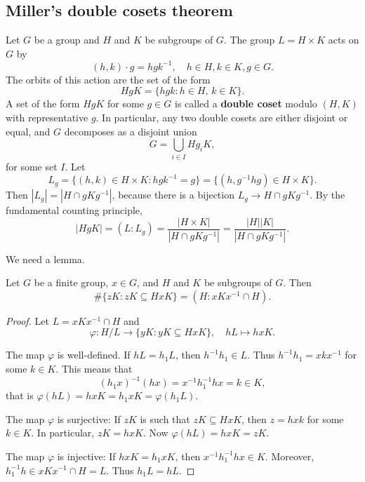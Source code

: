 


\subsection{Miller's double cosets theorem}

Let $G$ be a group and $H$ and $K$ be subgroups of $G$. 
The group $L=H\times K$ acts on $G$ by
\[
(h,k)\cdot g=hgk^{-1},\quad h\in H,k\in K,g\in G.
\]
The orbits of this action are the set of the form 
\[
HgK=\{hgk:h\in H,\,k\in K\}.
\]
A set of the form $HgK$ for some $g\in G$ is called a \textbf{double coset} modulo $(H,K)$ 
with representative $g$. In particular, 
any two double cosets are either disjoint or equal, and $G$ decomposes
as a disjoint union 
\[
G=\bigcup_{i\in I}Hg_iK,
\]
for some set $I$. Let 
\[
L_g=\{(h,k)\in H\times K:hgk^{-1}=g\}=\{(h,g^{-1}hg)\in H\times K\}.
\]
Then
$|L_g|=|H\cap gKg^{-1}|$, 
because there is a bijection $L_g\to H\cap gKg^{-1}$.  
By the fundamental counting principle, 
\[
|HgK|=(L:L_g)=\frac{|H\times K|}{|H\cap gKg^{-1}|}=\frac{|H||K|}{|H\cap gKg^{-1}|}.
\]

We need a lemma. 

\begin{lemma}
\label{lem:Miller}
    Let $G$ be a finite group, $x\in G$, and $H$ and $K$ be subgroups of $G$. Then
    \[
    \#\{zK:zK\subseteq HxK\}=(H:xKx^{-1}\cap H).
    \]
\end{lemma}

\begin{proof}
    Let $L=xKx^{-1}\cap H$ and 
    \[
    \varphi\colon H/L\to\{yK:yK\subseteq HxK\},\quad 
    hL\mapsto hxK.
    \]

    The map $\varphi$ is well-defined. If $hL=h_1L$, then $h^{-1}h_1\in L$. Thus 
    $h^{-1}h_1=xkx^{-1}$ for some $k\in K$. This means that
    \[
    (h_1x)^{-1}(hx)=x^{-1}h_1^{-1}hx=k\in K,
    \]
    that is $\varphi(hL)=hxK=h_1xK=\varphi(h_1L)$. 

    The map $\varphi$ is surjective: If $zK$ is such that $zK\subseteq HxK$, then 
    $z=hxk$ for some $k\in K$. In particular, 
    $zK=hxK$. Now $\varphi(hL)=hxK=zK$.

    The map $\varphi$ is injective: If $hxK=h_1xK$, then 
    $x^{-1}h_1^{-1}hx\in K$. Moreover, 
    $h_1^{-1}h\in xKx^{-1}\cap H=L$. Thus $h_1L=hL$. 
\end{proof}


